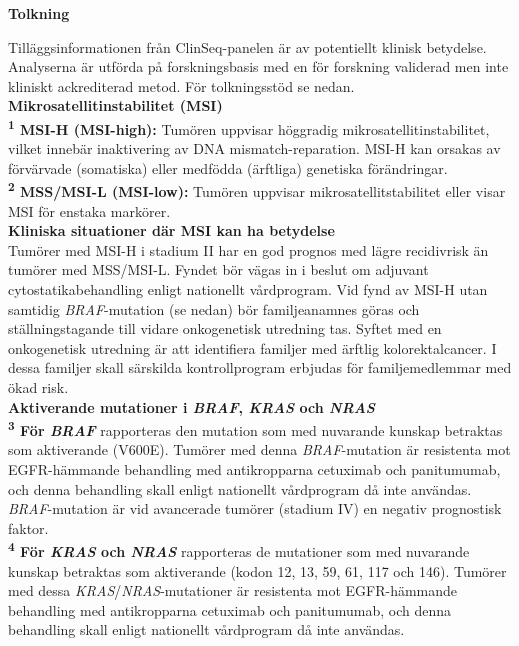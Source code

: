 \documentclass[10pt]{article}
\begin{document}
\vspace{0.3cm}

\textbf{Tolkning} \par
{\small
Tilläggsinformationen från ClinSeq-panelen är av potentiellt klinisk betydelse. Analyserna är utförda på forskningsbasis med en för forskning validerad men inte kliniskt ackrediterad metod. För tolkningsstöd se nedan. \\

\textbf{Mikrosatellitinstabilitet (MSI)}\\
\textbf{\textsuperscript{1} MSI-H (MSI-high):} Tumören uppvisar höggradig mikrosatellitinstabilitet, vilket innebär inaktivering av DNA mismatch-reparation. MSI-H kan orsakas av förvärvade (somatiska) eller medfödda (ärftliga) genetiska förändringar. \\
\textbf{\textsuperscript{2} MSS/MSI-L (MSI-low):} Tumören uppvisar mikrosatellitstabilitet eller visar MSI för enstaka markörer. \\

\textbf{Kliniska situationer där MSI kan ha betydelse}\\
Tumörer med MSI-H i stadium II har en god prognos med lägre recidivrisk än tumörer med MSS/MSI-L. Fyndet bör vägas in i beslut om adjuvant cytostatikabehandling enligt nationellt vårdprogram. Vid fynd av MSI-H utan samtidig \textit{BRAF}-mutation (se nedan) bör familjeanamnes göras och ställningstagande till vidare onkogenetisk utredning tas. Syftet med en onkogenetisk utredning är att identifiera familjer med ärftlig kolorektalcancer. I dessa familjer skall särskilda kontrollprogram erbjudas för familjemedlemmar med ökad risk. \\

\textbf{Aktiverande mutationer i \textit{BRAF}, \textit{KRAS} och \textit{NRAS}}\\
\textbf{\textsuperscript{3} För \textit{BRAF}} rapporteras den mutation som med nuvarande kunskap betraktas som aktiverande (V600E). Tumörer med denna \textit{BRAF}-mutation är resistenta mot EGFR-hämmande behandling med antikropparna cetuximab och panitumumab, och denna behandling skall enligt nationellt vårdprogram då inte användas. \textit{BRAF}-mutation är vid avancerade tumörer (stadium IV) en negativ prognostisk faktor. \\
\textbf{\textsuperscript{4} För \textit{KRAS} och \textit{NRAS}} rapporteras de mutationer som med nuvarande kunskap betraktas som aktiverande (kodon 12, 13, 59, 61, 117 och 146). Tumörer med dessa \textit{KRAS}/\textit{NRAS}-mutationer är resistenta mot EGFR-hämmande behandling med antikropparna cetuximab och panitumumab, och denna behandling skall enligt nationellt vårdprogram då inte användas. \\
}
\par

\end{document}

